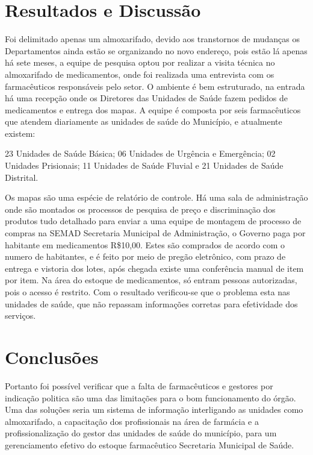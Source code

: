 \documentclass[article,12pt,onesidea,4paper,english,brazil]{abntex2}
\begin{document}
\section*{Resultados e Discussão}

Foi delimitado apenas um almoxarifado, devido aos transtornos de mudanças os Departamentos ainda estão se organizando no novo endereço, pois estão lá apenas há sete meses, a equipe de pesquisa optou por realizar a visita técnica no almoxarifado de medicamentos, onde foi realizada uma entrevista com os farmacêuticos responsáveis pelo setor. O ambiente é bem estruturado, na entrada há uma recepção onde os Diretores das Unidades de Saúde fazem pedidos de medicamentos e entrega dos mapas. A equipe é composta por seis farmacêuticos que atendem diariamente as unidades de saúde do Município, e atualmente existem:

23 Unidades de Saúde Básica; 06 Unidades de Urgência e Emergência; 02 Unidades Prisionais; 11 Unidades de Saúde Fluvial e 21 Unidades de Saúde Distrital.

Os mapas são uma espécie de relatório de controle. Há uma sala de administração onde são montados os processos de pesquisa de preço e discriminação dos produtos tudo detalhado para enviar a uma equipe de montagem de processo de compras na SEMAD Secretaria Municipal de Administração, o Governo paga por habitante em medicamentos R\$10,00. Estes são comprados de acordo com o numero de habitantes, e é feito por meio de pregão eletrônico, com prazo de entrega e vistoria dos lotes, após chegada existe uma conferência manual de item por item. Na área do estoque de medicamentos, só entram pessoas autorizadas, pois o acesso é restrito. Com o resultado verificou-se que o problema esta nas unidades de saúde, que não repassam informações corretas para efetividade dos serviços.


\section*{Conclusões}

Portanto foi possível verificar que a falta de farmacêuticos e gestores por indicação politica são uma das limitações para o bom funcionamento do órgão. Uma das soluções seria um sistema de informação interligando as unidades como almoxarifado, a capacitação dos profissionais na área de farmácia e a profissionalização do gestor das unidades de saúde do município, para um gerenciamento efetivo do estoque farmacêutico Secretaria Municipal de Saúde.
\end{document}
